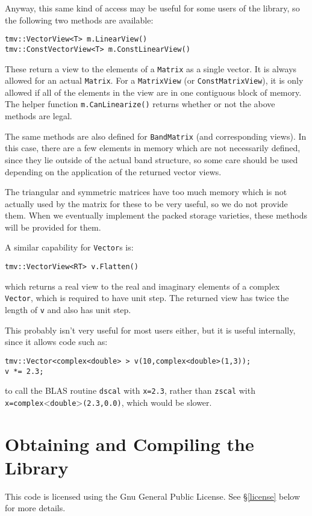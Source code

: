 \documentclass[twoside,letterpaper,11pt]{article}
\renewcommand{\tt}[1]{{\texttt {#1}}}
\begin{document}
Anyway, this same kind of access may be useful for some users of the library, 
so the following two methods are available:
\begin{verbatim}
tmv::VectorView<T> m.LinearView()
tmv::ConstVectorView<T> m.ConstLinearView()
\end{verbatim}
These return a view to the elements of a \tt{Matrix} as a single vector.  
It is always allowed for an actual \tt{Matrix}.  For a \tt{MatrixView} 
(or \tt{ConstMatrixView}), it is only allowed if all of the elements in the 
view are in one contiguous block of memory.  The helper function 
\tt{m.CanLinearize()} returns whether or not the above methods are legal.

The same methods are also defined for \tt{BandMatrix} (and corresponding views).
In this case, there are a few elements in memory which are not necessarily
defined, since they lie outside of the actual band structure, so some care
should be used depending on the application of the returned vector views.

The triangular and symmetric matrices have too much memory which is not
actually used by the matrix for these to be very useful, so we do not provide them.
When we eventually implement the packed storage varieties, these methods will
be provided for them.

A similar capability for \tt{Vector}s is:
\begin{verbatim}
tmv::VectorView<RT> v.Flatten()
\end{verbatim}
which returns a real view to the real and imaginary elements of a complex \tt{Vector},
which is required to have unit step.  The returned view has twice the 
length of \tt{v} and also has unit step.

This probably isn't very useful for most users either, but it is useful internally,
since it allows code such as:
\begin{verbatim}
tmv::Vector<complex<double> > v(10,complex<double>(1,3));
v *= 2.3;
\end{verbatim}
to call the BLAS routine \tt{dscal} with \tt{x=2.3}, rather than \tt{zscal}
with \tt{x=complex}<\tt{double}>\tt{(2.3,0.0)}, which would be slower.

\newpage
\section{Obtaining and Compiling the Library}

This code is licensed using the Gnu General Public License.  See 
\S\ref{license} below for more details.
\end{document}
